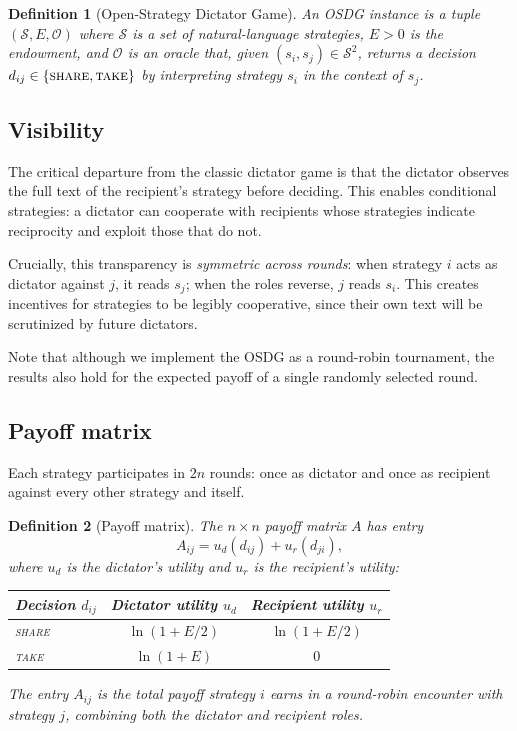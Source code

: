 \documentclass[11pt]{article}
\newtheorem{definition}{Definition}
\begin{document}
\begin{definition}[Open-Strategy Dictator Game]
An OSDG instance is a tuple $(\mathcal{S}, E, \mathcal{O})$ where
$\mathcal{S}$ is a set of natural-language strategies,
$E > 0$ is the endowment, and
$\mathcal{O}$ is an oracle that, given
$(s_i, s_j) \in \mathcal{S}^2$, returns a decision
$d_{ij} \in \{\textup{\textsc{share}}, \textup{\textsc{take}}\}$ by interpreting
strategy $s_i$ in the context of $s_j$.
\end{definition}

\subsection{Visibility}

The critical departure from the classic dictator game is that the
dictator observes the full text of the recipient's strategy before
deciding.  This enables conditional strategies: a dictator can
cooperate with recipients whose strategies indicate reciprocity
and exploit those that do not.

Crucially, this transparency is \emph{symmetric across rounds}:
when strategy $i$ acts as dictator against $j$, it reads $s_j$;
when the roles reverse, $j$ reads $s_i$.
This creates incentives for strategies to be legibly cooperative,
since their own text will be scrutinized by future dictators.

Note that although we implement the OSDG as a round-robin tournament, the results also hold for the expected payoff of a single randomly selected round.

\subsection{Payoff matrix}

Each strategy participates in $2n$ rounds: once as dictator and once as recipient
against every other strategy and itself.

\begin{definition}[Payoff matrix]
The $n \times n$ payoff matrix $A$ has entry
\begin{equation}
  A_{ij} = u_d(d_{ij}) + u_r(d_{ji}),
  \label{eq:payoff}
\end{equation}
where $u_d$ is the dictator's utility and $u_r$ is the recipient's utility:
\begin{center}
\begin{tabular}{lcc}
  \toprule
  Decision $d_{ij}$ & Dictator utility $u_d$ & Recipient utility $u_r$ \\
  \midrule
  \textup{\textsc{share}} & $\ln(1 + E/2)$ & $\ln(1 + E/2)$ \\
  \textup{\textsc{take}}  & $\ln(1 + E)$   & $0$ \\
  \bottomrule
\end{tabular}
\end{center}
The entry $A_{ij}$ is the total payoff strategy $i$ earns in a
round-robin encounter with strategy $j$, combining both the dictator
and recipient roles.
\end{definition}
\end{document}
